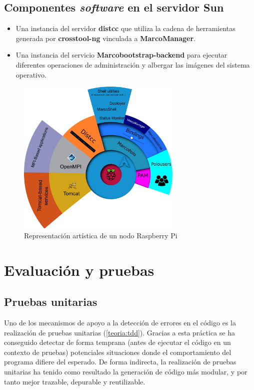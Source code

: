 \subsection{Componentes \textit{software} en el servidor Sun}

\begin{itemize}
	\item Una instancia del servidor \textbf{distcc} que utiliza la cadena de herramientas generada por \textbf{crosstool-ng} vinculada a \textbf{MarcoManager}.
	\item Una instancia del servicio \textbf{Marcobootstrap-backend} para ejecutar diferentes operaciones de administración y albergar las imágenes del sistema operativo.
\end{itemize}


\begin{figure}[H]
\centering
\includegraphics[width=0.7\textwidth]{Chapters/Chapter5/Figures/capas}
\caption{Representación artística de un nodo Raspberry Pi}
\end{figure}

\section{Evaluación y pruebas}
\label{chapter:evaluaciones}

\subsection{Pruebas unitarias}

Uno de los mecanismos de apoyo a la detección de errores en el código es la realización de pruebas unitarias (\ref{teoria:tdd}). Gracias a esta práctica se ha conseguido detectar de forma temprana (antes de ejecutar el código en un contexto de pruebas) potenciales situaciones donde el comportamiento del programa difiere del esperado. De forma indirecta, la realización de pruebas unitarias ha tenido como resultado la generación de código más modular, y por tanto mejor trazable, depurable y reutilizable.

